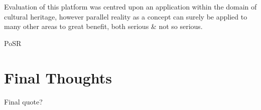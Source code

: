 Evaluation of this platform was centred upon an application within the domain of cultural heritage, however parallel reality as a concept can surely be applied to many other areas to great benefit, both serious \& not so serious.

PoSR


\section{Final Thoughts}

Final quote?

